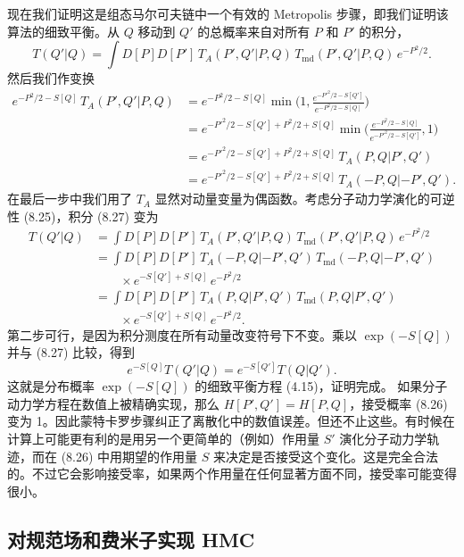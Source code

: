 现在我们证明这是组态马尔可夫链中一个有效的 Metropolis 步骤，即我们证明该算法的细致平衡。从 $Q$ 移动到 $Q'$ 的总概率来自对所有 $P$ 和 $P'$ 的积分，
\begin{equation}
T(Q'|Q) = \int D[P]D[P']\,T_A(P',Q'|P,Q)\,T_{\mathrm{md}}(P',Q'|P,Q)\,e^{-P^2/2}.
\end{equation}
然后我们作变换
\begin{equation}
\begin{split}
e^{-P^2/2-S[Q]}\,T_A(P',Q'|P,Q)
&= e^{-P^2/2-S[Q]}\min\!\Big(1,\frac{e^{-P'^2/2-S[Q']}}{e^{-P^2/2-S[Q]}}\Big)\\
&= e^{-P'^2/2-S[Q']+P^2/2+S[Q]}
   \min\!\Big(\frac{e^{-P^2/2-S[Q]}}{e^{-P'^2/2-S[Q']}},1\Big)\\
&= e^{-P'^2/2-S[Q']+P^2/2+S[Q]}\,T_A(P,Q|P',Q')\\
&= e^{-P'^2/2-S[Q']+P^2/2+S[Q]}\,T_A(-P,Q|-P',Q').
\end{split}
\end{equation}
在最后一步中我们用了 $T_A$ 显然对动量变量为偶函数。考虑分子动力学演化的可逆性 (8.25)，积分 (8.27) 变为
\begin{equation}
\begin{split}
T(Q'|Q) &= \int D[P]D[P']\,T_A(P',Q'|P,Q)\,T_{\mathrm{md}}(P',Q'|P,Q)\,e^{-P^2/2}\\
&= \int D[P]D[P']\,T_A(-P,Q|-P',Q')\,T_{\mathrm{md}}(-P,Q|-P',Q')\\
&\qquad \times e^{-S[Q']+S[Q]}\,e^{-P^2/2}\\
&= \int D[P]D[P']\,T_A(P,Q|P',Q')\,T_{\mathrm{md}}(P,Q|P',Q')\\
&\qquad \times e^{-S[Q']+S[Q]}\,e^{-P^2/2}.
\end{split}
\end{equation}
第二步可行，是因为积分测度在所有动量改变符号下不变。乘以 $\exp(-S[Q])$ 并与 (8.27) 比较，得到
\begin{equation}
e^{-S[Q]}T(Q'|Q) = e^{-S[Q']}T(Q|Q').
\end{equation}
这就是分布概率 $\exp(-S[Q])$ 的细致平衡方程 (4.15)，证明完成。
如果分子动力学方程在数值上被精确实现，那么 $H[P',Q'] = H[P,Q]$，接受概率 (8.26) 变为 1。因此蒙特卡罗步骤纠正了离散化中的数值误差。但还不止这些。有时候在计算上可能更有利的是用另一个更简单的（例如）作用量 $S'$ 演化分子动力学轨迹，而在 (8.26) 中用期望的作用量 $S$ 来决定是否接受这个变化。这是完全合法的。不过它会影响接受率，如果两个作用量在任何显著方面不同，接受率可能变得很小。

\subsection{对规范场和费米子实现 HMC}

